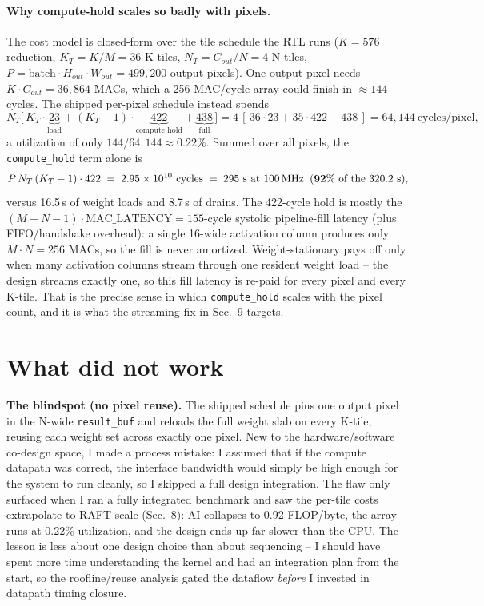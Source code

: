 \documentclass[11pt]{article}
\begin{document}
\paragraph{Why compute-hold scales so badly with pixels.} The cost model is
closed-form over the tile schedule the RTL runs ($K{=}576$ reduction,
$K_T{=}K/M{=}36$ K-tiles, $N_T{=}C_{out}/N{=}4$ N-tiles,
$P{=}\text{batch}\cdot H_{out}\cdot W_{out}{=}499{,}200$ output pixels). One
output pixel needs $K\cdot C_{out}=36{,}864$ MACs, which a 256-MAC/cycle array
could finish in $\approx144$ cycles. The shipped per-pixel schedule instead
spends
\[
  N_T\big[\,K_T\cdot\underbrace{23}_{\text{load}}
          +(K_T-1)\cdot\underbrace{422}_{\text{compute\_hold}}
          +\underbrace{438}_{\text{full}}\,\big]
  = 4\,[\,36\cdot23 + 35\cdot422 + 438\,] = 64{,}144\ \text{cycles/pixel},
\]
a utilization of only $144/64{,}144\approx0.22\%$. Summed over all pixels, the
\texttt{compute\_hold} term alone is
\[
  P\,N_T\,(K_T-1)\cdot 422 \;=\; 2.95\times10^{10}\ \text{cycles}
  \;=\; 295\ \text{s at 100\,MHz} \;\;(\mathbf{92\%}\ \text{of the }320.2\ \text{s}),
\]
versus 16.5\,s of weight loads and 8.7\,s of drains. The 422-cycle hold is
mostly the $(M{+}N{-}1)\cdot\text{MAC\_LATENCY}=155$-cycle systolic
pipeline-fill latency (plus FIFO/handshake overhead): a single 16-wide
activation column produces only $M\cdot N=256$ MACs, so the fill is never
amortized. Weight-stationary pays off only when many activation columns stream
through one resident weight load -- the design streams exactly one, so this
fill latency is re-paid for every pixel and every K-tile. That is the precise
sense in which \texttt{compute\_hold} scales with the pixel count, and it is
what the streaming fix in Sec.~9 targets.

\section{What did not work}

\textbf{The blindspot (no pixel reuse).} The shipped schedule pins one output
pixel in the N-wide \texttt{result\_buf} and reloads the full weight slab on
every K-tile, reusing each weight set across exactly one pixel. New to the
hardware/software co-design space, I made a process mistake: I assumed that if
the compute datapath was correct, the interface bandwidth would simply be high
enough for the system to run cleanly, so I skipped a full design integration.
The flaw only surfaced when I ran a fully integrated benchmark and saw the
per-tile costs extrapolate to RAFT scale (Sec.~8): AI collapses to 0.92
FLOP/byte, the array runs at 0.22\% utilization, and the design ends up far
slower than the CPU. The lesson is less about one design choice than about
sequencing -- I should have spent more time understanding the kernel and had an
integration plan from the start, so the roofline/reuse analysis gated the
dataflow \emph{before} I invested in datapath timing closure.
\end{document}
